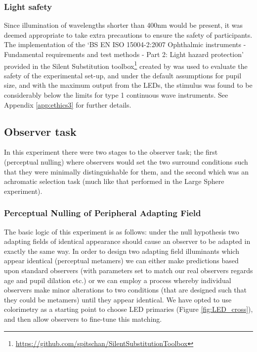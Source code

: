 \subsubsection{Light safety}
Since illumination of wavelengths shorter than 400nm would be present, it was deemed appropriate to take extra precautions to ensure the safety of participants. 
The implementation of the `BS EN ISO 15004-2:2007 Ophthalmic instruments - Fundamental requirements and test methods - Part 2: Light hazard protection' \citep{iso/tc_172/sc_7_ophthalmic_optics_and_instruments_bs_2007} provided in the Silent Substitution toolbox\footnote{\url{https://github.com/spitschan/SilentSubstitutionToolbox}} created by \citet{spitschan_selective_2015} was used to evaluate the safety of the experimental set-up, and under the default assumptions for pupil size, and with the maximum output from the LEDs, the stimulus was found to be considerably below the limits for type 1 continuous wave instruments. See Appendix \ref{app:ethics3} for further details.


\subsection{Observer task}

In this experiment there were two stages to the observer task; the first (perceptual nulling) where observers would set the two surround conditions such that they were minimally distinguishable for them, and the second which was an achromatic selection task (much like that performed in the Large Sphere experiment).

\subsubsection{Perceptual Nulling of Peripheral Adapting Field} \label{sec:null}

The basic logic of this experiment is as follows: under the null hypothesis two adapting fields of identical appearance should cause an observer to be adapted in exactly the same way. In order to design two adapting field illuminants which appear identical (perceptual metamers) we can either make predictions based upon standard observers (with parameters set to match our real observers regards age and pupil dilation etc.) or we can employ a process whereby individual observers make minor alterations to two conditions (that are designed such that they could be metamers) until they appear identical. We have opted to use colorimetry as a starting point to choose LED primaries (Figure \ref{fig:LED_cross}), and then allow observers to fine-tune this matching.

